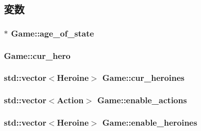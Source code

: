 \subsection{変数}
\hypertarget{class_game_a9884a280415f35cb77380b459aa2fca1}{
\subsubsection[{age\-\_\-of\-\_\-state}]{$\ast$ {\bf Game\-::age\-\_\-of\-\_\-state}}}\label{class_game_a9884a280415f35cb77380b459aa2fca1}
\hypertarget{class_game_a4e71d5aa50da2da9e814fb3245c5fd12}{
\subsubsection[{cur\-\_\-hero}]{ {\bf Game\-::cur\-\_\-hero}}}\label{class_game_a4e71d5aa50da2da9e814fb3245c5fd12}
\hypertarget{class_game_a50949f6170d517f879db0b9c40fe563a}{
\subsubsection[{cur\-\_\-heroines}]{\setlength{\rightskip}{0pt plus 5cm}std\-::vector$<${\bf Heroine}$>$ {\bf Game\-::cur\-\_\-heroines}}}\label{class_game_a50949f6170d517f879db0b9c40fe563a}
\hypertarget{class_game_a64703f92ea3218370a38d65a279bde7c}{
\subsubsection[{enable\-\_\-actions}]{\setlength{\rightskip}{0pt plus 5cm}std\-::vector$<${\bf Action}$>$ {\bf Game\-::enable\-\_\-actions}}}\label{class_game_a64703f92ea3218370a38d65a279bde7c}
\hypertarget{class_game_a3d20a4c7faf985ccddec4e0758b85dd8}{
\subsubsection[{enable\-\_\-heroines}]{\setlength{\rightskip}{0pt plus 5cm}std\-::vector$<${\bf Heroine}$>$ {\bf Game\-::enable\-\_\-heroines}}}\label{class_game_a3d20a4c7faf985ccddec4e0758b85dd8}
